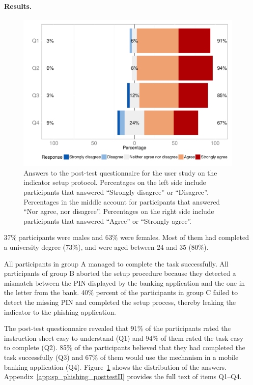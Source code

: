 \paragraph{Results.}

\begin{figure}[!ht]
	\centering
	\includegraphics[width=.8\columnwidth]{figures/securingphone/phishing_second_likert}
	\caption[Answers to the post-test questionnaire for the user study on the indicator setup protocol]{
    Answers to the post-test questionnaire for the user study on the indicator setup protocol.
	Percentages on the left side include participants that answered ``Strongly disagree'' or ``Disagree''.
	Percentages in the middle account for participants that answered ``Nor agree, nor disagree''.
	Percentages on the right side include participants that answered ``Agree'' or ``Strongly agree''.}
	\label{plot:sp_phishing_second_likert}
\end{figure}

37\% participants were males and 63\% were females. Most of them had completed a university degree (73\%), and were aged between 24 and 35 (80\%).

All participants in group A managed to complete the task successfully.
All participants of group B aborted the setup procedure because they detected a mismatch between the PIN displayed by the banking application and the one in the letter from the bank.
40\% percent of the participants in group C failed to detect the missing PIN and completed the setup process, thereby leaking the indicator to the phishing application.

The post-test questionnaire revealed that 91\% of the participants rated the instruction sheet easy to understand (Q1) and 94\% of them rated the task easy to complete (Q2).
85\% of the participants believed that they had completed the task successfully (Q3) and 67\%  of them would use the mechanism in a mobile banking application (Q4).
Figure~\ref{plot:sp_phishing_second_likert} shows the distribution of the answers.
Appendix~\ref{app:sp_phishing_posttestII} provides the full text of items Q1--Q4.

